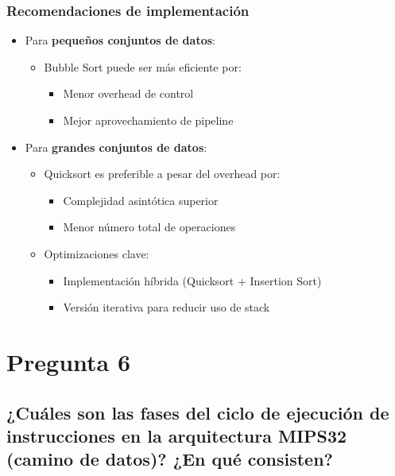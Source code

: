 \documentclass{article}
\begin{document}
\subsubsection*{Recomendaciones de implementación}

\begin{itemize}
    \item Para \textbf{pequeños conjuntos de datos}:
    \begin{itemize}
        \item Bubble Sort puede ser más eficiente por:
        \begin{itemize}
            \item Menor overhead de control
            \item Mejor aprovechamiento de pipeline
        \end{itemize}
    \end{itemize}

    \item Para \textbf{grandes conjuntos de datos}:
    \begin{itemize}
        \item Quicksort es preferible a pesar del overhead por:
        \begin{itemize}
            \item Complejidad asintótica superior
            \item Menor número total de operaciones
        \end{itemize}
        \item Optimizaciones clave:
        \begin{itemize}
            \item Implementación híbrida (Quicksort + Insertion Sort)
            \item Versión iterativa para reducir uso de stack
        \end{itemize}
    \end{itemize}
\end{itemize}


\section*{Pregunta 6}

\subsection*{¿Cuáles son las fases del ciclo de ejecución de instrucciones en la arquitectura MIPS32 
(camino de datos)? ¿En qué consisten? }
\end{document}
